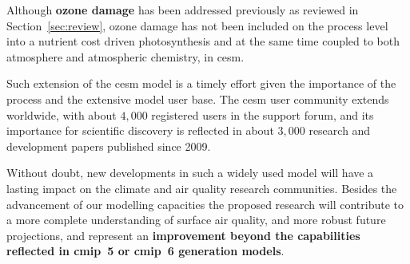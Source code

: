 Although \textbf{ozone damage} has been addressed previously as reviewed in Section~\ref{sec:review}, ozone damage has not been included on the process level into a nutrient cost driven photosynthesis and at the same time coupled to both atmosphere and atmospheric chemistry, in \gls{cesm}.

Such extension of the \gls{cesm} model is a timely effort given the importance of the process and the extensive model user base. The \gls{cesm} user community extends worldwide, with about $4,000$ registered users in the support forum, and its importance for scientific discovery is reflected in about $3,000$ research and development papers published since 2009.

Without doubt, new developments in such a widely used model will have a lasting impact on the climate and air quality research communities. Besides the advancement of our modelling capacities the proposed research will contribute to a more complete understanding of surface air quality, and more robust future projections, and represent an \textbf{improvement beyond the capabilities reflected in \gls{cmip}~5 or \gls{cmip}~6 generation models}.
